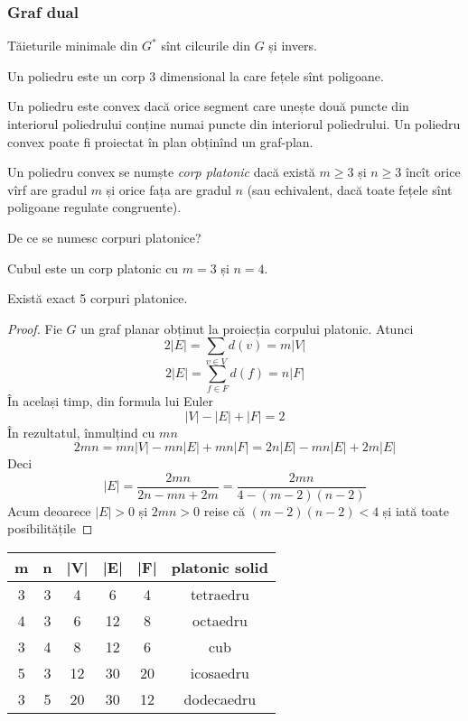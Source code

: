 \begin{frame}
  \frametitle{Graf dual}

Tăieturile minimale din $G^*$ sînt cilcurile din $G$ și invers.

\end{frame}


\begin{frame}
 \begin{definition}
Un poliedru este un corp 3 dimensional la care fețele sînt poligoane.
\end{definition}

Un poliedru este convex dacă orice segment care unește două puncte din 
interiorul poliedrului conține numai puncte din interiorul poliedrului. Un 
poliedru convex poate fi proiectat în plan obținînd un graf-plan.

\begin{definition}
Un poliedru convex se numște \emph{corp platonic} dacă există $m\geq 3$ și 
$n\geq 3$ încît orice vîrf are gradul $m$ și orice fața are gradul $n$ (sau 
echivalent, dacă toate fețele sînt poligoane regulate congruente).
\end{definition}

De ce se numesc corpuri platonice?

Cubul este un corp platonic cu $m=3$ și $n=4$.
\end{frame}

\begin{frame}
 \begin{theorem}
Există exact 5 corpuri platonice.
\end{theorem}
\begin{proof}
Fie $G$ un graf planar obținut la proiecția corpului platonic. Atunci 
\[
2|E|=\sum_{v\in V}d(v) = m|V|
\]
\[
2|E|=\sum_{f\in F}d(f) = n|F|
\]
În același timp, din formula lui Euler
\[
 |V|-|E|+|F|=2
\]
În rezultatul, înmulțind cu $mn$
\[
 2mn = mn|V|-mn|E|+mn|F|
 =2n|E|-mn|E|+2m|E|
\]
Deci
\[
 |E|=\frac{2mn}{2n-mn+2m}=\frac{2mn}{4-(m-2)(n-2)}
\]
Acum deoarece $|E|>0$ și $2mn>0$ reise că $(m-2)(n-2)< 4$ și iată toate 
posibilitățile



\end{proof}
\end{frame}

\begin{frame}
 \begin{tabular}{cccccc}
\hline
m&n&|V|&|E|&|F|&platonic solid\\
\hline
3&3&4&6&4&tetraedru\\
4&3&6&12&8&octaedru\\
3&4&8&12&6&cub\\
5&3&12&30&20&icosaedru\\
3&5&20&30&12&dodecaedru
\end{tabular}
\end{frame}





